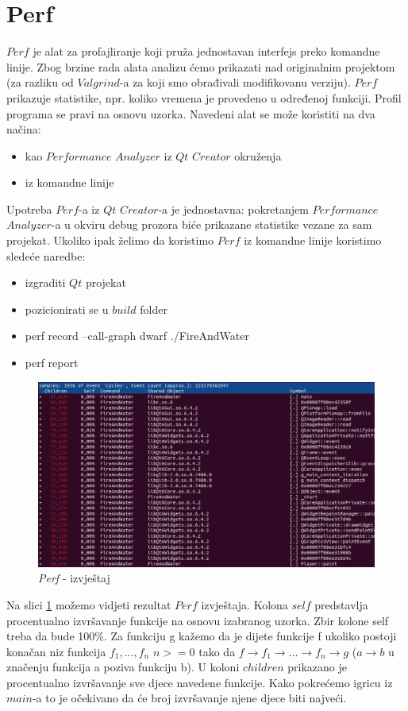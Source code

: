 \documentclass[a4paper]{article}
\begin{document}
\section{Perf}
	$Perf$ je alat za profajliranje koji pruža jednostavan interfejs preko komandne linije. Zbog brzine rada alata analizu ćemo prikazati nad originalnim projektom (za razliku od $Valgrind$-a za koji smo obrađivali modifikovanu verziju). $Perf$ prikazuje statistike, npr. koliko vremena je provedeno u određenoj funkciji. Profil programa se pravi na osnovu uzorka.
Navedeni alat se može koristiti na dva načina:
\begin{itemize}
	\item kao $Performance$ $Analyzer$ iz $Qt$ $Creator$ okruženja
	\item iz komandne linije
\end{itemize}
Upotreba $Perf$-a iz $Qt$ $Creator$-a je jednostavna: pokretanjem $Performance$ $Analyzer$-a u okviru debug prozora biće prikazane statistike vezane za sam projekat. Ukoliko ipak želimo da koristimo $Perf$ iz komandne linije koristimo sledeće naredbe:
\begin{itemize}
	\item izgraditi $Qt$ projekat
	\item pozicionirati se u $build$ folder
	\item perf record --call-graph dwarf ./FireAndWater
	\item perf report
\end{itemize}

	\begin{figure}[h!]
		\caption{\textit{Perf} - izvještaj}
		\label{fig:p1}
		\includegraphics[scale=0.4]{p1.png}
	\end{figure}
	
	Na slici \ref{fig:p1} možemo vidjeti rezultat $Perf$ izvještaja. Kolona $self$ predstavlja procentualno izvršavanje funkcije na osnovu izabranog uzorka. Zbir kolone self treba da bude 100\%. Za funkciju g kažemo da je dijete funkcije f ukoliko postoji konačan niz funkcija $f_1,...,f_n$ $n>=0$ tako da $f \rightarrow f_1\rightarrow...\rightarrow f_n\rightarrow g$ ($a \rightarrow b$ u značenju funkcija a poziva funkciju b). U koloni $children$ prikazano je procentualno izvršavanje sve djece navedene funkcije. Kako pokrećemo igricu iz $main$-a to je očekivano da će broj izvršavanje njene djece biti najveći. 
	
\end{document}
